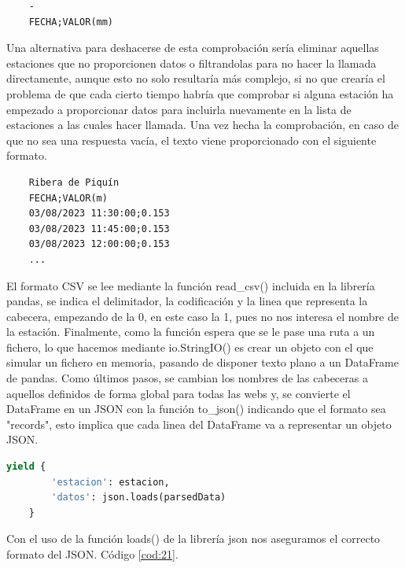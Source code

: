 \begin{verbatim}
	-
	FECHA;VALOR(mm)
\end{verbatim}

Una alternativa para deshacerse de esta comprobación sería eliminar aquellas estaciones que no proporcionen datos o filtrandolas para no hacer la llamada directamente, aunque esto no solo resultaría más complejo, si no que crearía el problema de que cada cierto tiempo habría que comprobar si alguna estación ha empezado a proporcionar datos para incluirla nuevamente en la lista de estaciones a las cuales hacer llamada.\newline
\newline
Una vez hecha la comprobación, en caso de que no sea una respuesta vacía, el texto viene proporcionado con el siguiente formato.

\begin{verbatim}
	Ribera de Piquín
	FECHA;VALOR(m)
	03/08/2023 11:30:00;0.153
	03/08/2023 11:45:00;0.153
	03/08/2023 12:00:00;0.153
	...
\end{verbatim}

El formato CSV se lee mediante la función read\_csv() incluida en la librería pandas, se indica el delimitador, la codificación y la linea que representa la cabecera, empezando de la 0, en este caso la 1, pues no nos interesa el nombre de la estación. Finalmente, como la función espera que se le pase una ruta a un fichero, lo que hacemos mediante io.StringIO() es crear un objeto con el que simular un fichero en memoria, pasando de disponer texto plano a un DataFrame de pandas.\newline
\newline
Como últimos pasos, se cambian los nombres de las cabeceras a aquellos definidos de forma global para todas las webs y, se convierte el DataFrame en un JSON con la función to\_json() indicando que el formato sea "records", esto implica que cada linea del DataFrame va a representar un objeto JSON.

\begin{lstlisting}[language=Python, caption={Guardado de datos de CHCantábrico Nivel Spider}, label=cod:21]
	yield {
		'estacion': estacion,
		'datos': json.loads(parsedData)
	}
\end{lstlisting}

Con el uso de la función loads() de la librería json nos aseguramos el correcto formato del JSON. Código \ref{cod:21}.

